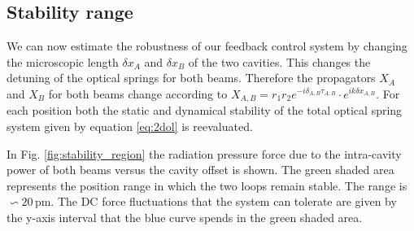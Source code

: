 \subsection{Stability range}
\label{sec:stability}
%
We can now estimate the robustness of our feedback control system 
by changing the microscopic length $\delta x_A$ and $\delta x_B$ of the two cavities. This changes the detuning of the optical springs for both beams. Therefore the propagators $X_A$ and $X_B$ for both beams change according to $X_{A,B}=r_1r_2 e^{-i\delta_{A,B}\tau_{A,B}}\cdot e^{ik\delta x_{A,B}}$. For each position both the static and dynamical stability of the total optical spring system given by equation \ref{eq:2dol}
is reevaluated.

In Fig. \ref{fig:stability_region} the radiation pressure force due to the intra-cavity power of both beams
versus the cavity offset is shown. The green shaded area represents the position range in which the two loops remain stable.  The range is $\backsim 20\,$pm. 
The DC force fluctuations that the system can tolerate are given by the y-axis interval that the blue curve spends in the green shaded area. %

